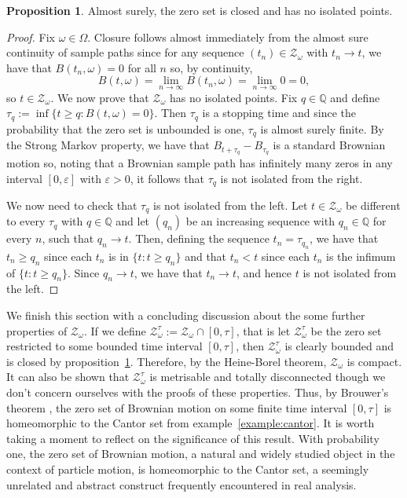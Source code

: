 \documentclass[a4paper,11pt]{article}
\theoremstyle{plain}
\theoremstyle{definition}
\newtheorem{proposition}[theorem]{Proposition}
\begin{document}
\begin{proposition}\label{prop:perfectset}
Almost surely, the zero set is closed and has no isolated points.
\end{proposition}

\begin{proof}\citep[p.~48]{M&P}
Fix $\omega \in \Omega$. Closure follows almost immediately from the almost sure continuity of sample paths since for any sequence $(t_n) \in \mathcal{Z}_\omega$ with $t_n \to t$, we have that $B(t_n,\omega) = 0$ for all $n$ so, by continuity,
\[
B(t,\omega) = \lim_{n \rightarrow \infty} B(t_n,\omega) = \lim_{n \rightarrow \infty} 0 = 0,
\]
so $t \in \mathcal{Z}_\omega$. We now prove that $\mathcal{Z}_\omega$ has no isolated points. Fix $q \in \mathbb{Q}$ and define $\tau_q := \inf\{t \geq q: B(t,\omega) = 0\}$. Then $\tau_q$ is a stopping time and since the probability that the zero set is unbounded is one, $\tau_q$ is almost surely finite. By the Strong Markov property, we have that $B_{t + \tau_q} - B_{\tau_q}$ is a standard Brownian motion so, noting that a Brownian sample path has infinitely many zeros in any interval $[0,\varepsilon]$ with $\varepsilon > 0$, it follows that $\tau_q$ is not isolated from the right.

We now need to check that $\tau_q$ is not isolated from the left. Let $t \in \mathcal{Z}_\omega$ be different to every $\tau_q$ with $q \in \mathbb{Q}$ and let $(q_n)$ be an increasing sequence with $q_n \in \mathbb{Q}$ for every $n$, such that $q_n \rightarrow t$. Then, defining the sequence $t_n = \tau_{q_n}$, we have that $t_n \geq q_n$ since each $t_n$ is in $\{t:t \geq q_n\}$ and that $t_n < t$ since each $t_n$ is the infimum of $\{t:t \geq q_n\}$. Since $q_n \rightarrow t$, we have that $t_n \rightarrow t$, and hence $t$ is not isolated from the left.
\end{proof}

We finish this section with a concluding discussion about the some further properties of $\mathcal{Z}_\omega$. If we define $\mathcal{Z}_\omega^\tau := \mathcal{Z}_\omega \cap [0,\tau]$, that is let $\mathcal{Z}_\omega^\tau$ be the zero set restricted to some bounded time interval $[0,\tau]$, then $\mathcal{Z}_\omega^\tau$ is clearly bounded and is closed by proposition~\ref{prop:perfectset}. Therefore, by the Heine-Borel theorem, $\mathcal{Z}_\omega$ is compact. It can also be shown that $\mathcal{Z}_\omega^\tau$ is metrisable and totally disconnected though we don't concern ourselves with the proofs of these properties. Thus, by Brouwer's theorem \citep[pp.~8--9]{MF}, the zero set of Brownian motion on some finite time interval $[0,\tau]$ is homeomorphic to the Cantor set from example~\ref{example:cantor}. It is worth taking a moment to reflect on the significance of this result. With probability one, the zero set of Brownian motion, a natural and widely studied object in the context of particle motion, is homeomorphic to the Cantor set, a seemingly unrelated and abstract construct frequently encountered in real analysis.
\end{document}
